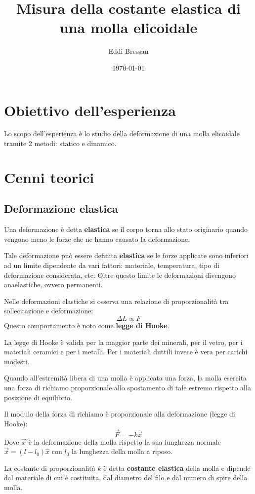 \documentclass[a4paper,12pt]{article}
\title{Misura della costante elastica di una molla elicoidale}
\author{Eddi Bressan}
\date{\today}
\begin{document}
\maketitle
\tableofcontents
\newpage

\section{Obiettivo dell'esperienza}
Lo scopo dell'esperienza è lo studio della deformazione di una molla elicoidale tramite 2 metodi: statico e dinamico.

\section{Cenni teorici}

\subsection{Deformazione elastica}
Una deformazione è detta \textbf{elastica} se il corpo torna allo stato originario quando
vengono meno le forze che ne hanno causato la deformazione.

Tale deformazione può essere definita \textbf{elastica} se le forze applicate sono inferiori
ad un limite dipendente da vari fattori: materiale, temperatura, tipo di deformazione considerata, etc.
Oltre questo limite le deformazioni divengono anaelastiche, ovvero permanenti.

Nelle deformazioni elastiche si osserva una relazione di proporzionalità tra sollecitazione e deformazione:
$$
\Delta L \propto F
$$
\noindent
Questo comportamento è noto come \textbf{legge di Hooke}.

La legge di Hooke è valida per la maggior parte dei minerali, per il vetro,
per i materiali ceramici e per i metalli. Per i materiali duttili invece è vera per carichi modesti.

Quando all'estremità libera di una molla è applicata una forza,
la molla esercita una forza di richiamo proporzionale allo spostamento di tale 
estremo rispetto alla posizione di equilibrio.

Il modulo della forza di richiamo è proporzionale alla deformazione (legge di Hooke):
$$
\vec{F} = -k \vec{x}
$$
Dove $\vec{x}$ è la deformazione della molla rispetto la sua lunghezza normale $\vec{x} = (l - l_{0})\hat{x}$
con $l_0$ la lunghezza della molla a riposo.

La costante di proporzionalità $k$ è detta \textbf{costante elastica} della molla e 
dipende dal materiale di cui è costituita, dal diametro del filo e dal numero di spire della molla.
\end{document}
